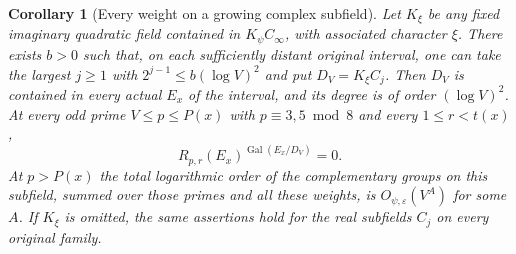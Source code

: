 \documentclass[a4paper,11pt]{article}
\newtheorem{corollary}[proposition]{Corollary}
\theoremstyle{definition}
\theoremstyle{remark}
\numberwithin{equation}{section}
\begin{document}
\begin{corollary}[Every weight on a growing complex subfield]
\leavevmode\label{cor:complexallweights542}
Let \(K_\xi\) be any fixed imaginary quadratic field contained
in \(K_\psi C_\infty\), with associated character \(\xi\).
There exists \(b>0\) such that, on each sufficiently distant
original interval, one can take the largest \(j\ge1\) with
\(2^{j-1}\le b(\log V)^2\) and put \(D_V=K_\xi C_j\).
Then \(D_V\) is contained in every actual \(E_x\) of the
interval, and its degree is of order \((\log V)^2\). At
every odd prime \(V\le p\le P(x)\) with \(p\equiv3,5\bmod8\)
and every \(1\le r<t(x)\),
\[
                 R_{p,r}(E_x)^{\operatorname{Gal}(E_x/D_V)}=0 .
\]
At \(p>P(x)\) the total logarithmic order of the complementary
groups on this subfield, summed over those primes and all these
weights, is \(O_{\psi,\varepsilon}(V^{A})\) for some \(A\).
If \(K_\xi\) is omitted, the same assertions hold for the
real subfields \(C_j\) on every original family.
\end{corollary}
\end{document}
